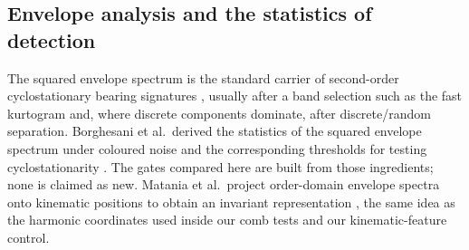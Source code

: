 \subsection{Envelope analysis and the statistics of detection}

The squared envelope spectrum is the standard carrier of second-order cyclostationary bearing signatures \cite{randall2011},
usually after a band selection such as the fast kurtogram \cite{antoni2007kurtogram} and, where discrete components
dominate, after discrete/random separation. Borghesani et al.\ derived the statistics of the squared envelope spectrum under
coloured noise and the corresponding thresholds for testing cyclostationarity \cite{borghesani2013}. The gates compared here
are built from those ingredients; none is claimed as new. Matania et al.\ project order-domain envelope spectra onto
kinematic positions to obtain an invariant representation \cite{matania2025}, the same idea as the harmonic
coordinates used inside our comb tests and our kinematic-feature control.
